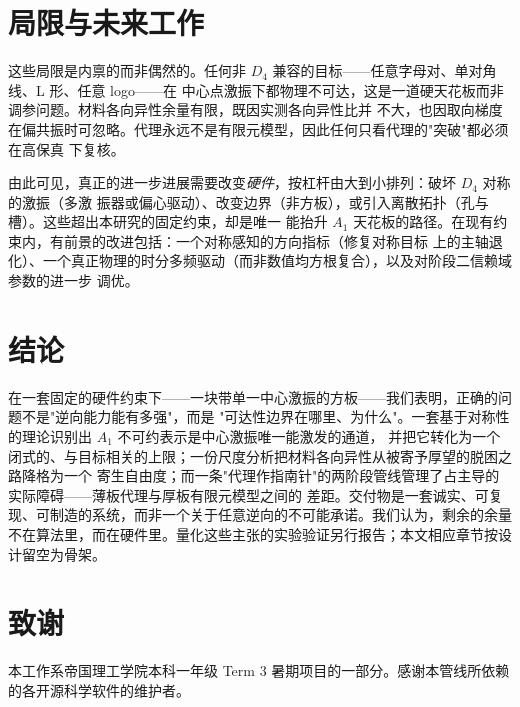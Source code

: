 \documentclass[11pt,a4paper]{article}
\newcommand{\Aone}{A_1}
\newcommand{\Dfour}{D_4}
\begin{document}
\section{局限与未来工作}\label{sec:limits}

这些局限是内禀的而非偶然的。任何非 $\Dfour$ 兼容的目标------任意字母对、单对角线、L 形、任意 logo------在
中心点激振下都物理不可达，这是一道硬天花板而非调参问题。材料各向异性余量有限，既因实测各向异性比并
不大，也因取向梯度在偏共振时可忽略。代理永远不是有限元模型，因此任何只看代理的"突破"都必须在高保真
下复核。

由此可见，真正的进一步进展需要改变\emph{硬件}，按杠杆由大到小排列：破坏 $\Dfour$ 对称的激振（多激
振器或偏心驱动）、改变边界（非方板），或引入离散拓扑（孔与槽）。这些超出本研究的固定约束，却是唯一
能抬升 $\Aone$ 天花板的路径。在现有约束内，有前景的改进包括：一个对称感知的方向指标（修复对称目标
上的主轴退化）、一个真正物理的时分多频驱动（而非数值均方根复合），以及对阶段二信赖域参数的进一步
调优。

\section{结论}\label{sec:conclusion}

在一套固定的硬件约束下------一块带单一中心激振的方板------我们表明，正确的问题不是"逆向能力能有多强"，而是
"可达性边界在哪里、为什么"。一套基于对称性的理论识别出 $\Aone$ 不可约表示是中心激振唯一能激发的通道，
并把它转化为一个闭式的、与目标相关的上限；一份尺度分析把材料各向异性从被寄予厚望的脱困之路降格为一个
寄生自由度；而一条"代理作指南针"的两阶段管线管理了占主导的实际障碍------薄板代理与厚板有限元模型之间的
差距。交付物是一套诚实、可复现、可制造的系统，而非一个关于任意逆向的不可能承诺。我们认为，剩余的余量
不在算法里，而在硬件里。量化这些主张的实验验证另行报告；本文相应章节按设计留空为骨架。

\section*{致谢}
本工作系帝国理工学院本科一年级 Term 3 暑期项目的一部分。感谢本管线所依赖的各开源科学软件的维护者。
\end{document}
